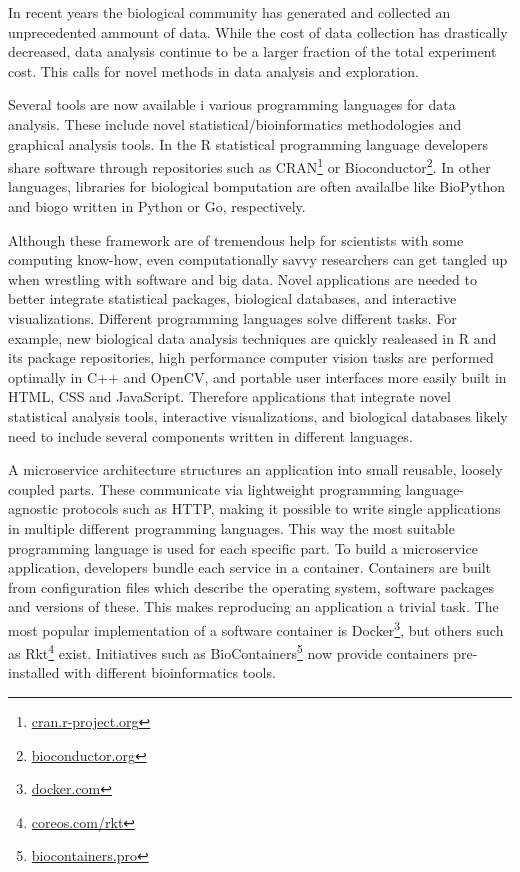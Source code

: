 In recent years the biological community has generated and collected an
unprecedented ammount of data.
While the cost of data collection has drastically decreased, data analysis
continue to be a larger fraction of the total experiment
cost.\cite{sboner2011real} This calls for novel methods in data analysis and
exploration. 

Several tools are now available i various programming languages for data
analysis. These include novel statistical/bioinformatics methodologies and
graphical analysis tools.
In the R statistical programming language developers share software through
repositories such as CRAN\footnote{\url{cran.r-project.org}} or
Bioconductor\footnote{\url{bioconductor.org}}.  In other languages, libraries
for biological bomputation are often availalbe like BioPython\cite{biopython}
and biogo\cite{biogo} written in Python or Go, respectively. 

Although these framework are of tremendous help for scientists with some
computing know-how, even computationally savvy researchers can get tangled up
when wrestling with software and big data. 
Novel applications are needed to better integrate statistical
packages, biological databases, and interactive visualizations.
Different programming languages solve different tasks. 
For example, new biological data analysis techniques are quickly realeased in R
and its package repositories, high performance computer vision tasks are
performed optimally in C++ and OpenCV, and portable user interfaces more easily
built in HTML, CSS and JavaScript. Therefore applications that integrate novel
statistical analysis tools, interactive visualizations, and biological databases
likely need to include several components written in different languages. 

A microservice architecture structures an application into small reusable,
loosely coupled parts. These communicate via lightweight programming
language-agnostic protocols such as HTTP, making it possible to write single
applications in multiple different programming languages. This way the
most suitable programming language is used for each specific part. To build a
microservice application, developers bundle each service in a container.
Containers are built from configuration files which describe the operating
system, software packages and versions of these. This makes reproducing an
application a trivial task. The most popular implementation of a software
container is Docker\footnote{\url{docker.com}}, but others such as
Rkt\footnote{\url{coreos.com/rkt}} exist. Initiatives such as
BioContainers\footnote{\url{biocontainers.pro}} now provide containers
pre-installed with different bioinformatics tools. 

